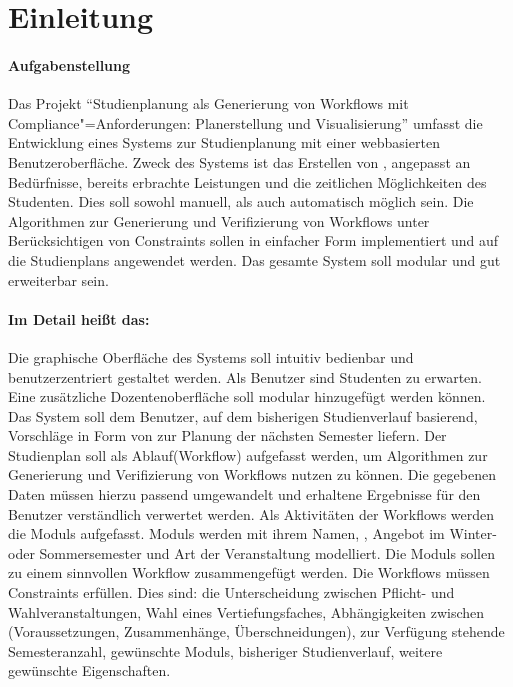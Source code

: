 \section{Einleitung}
\paragraph{Aufgabenstellung}
Das Projekt \enquote{Studienplanung als Generierung von Workflows mit Compliance"=Anforderungen: Planerstellung und Visualisierung} umfasst die Entwicklung eines Systems zur Studienplanung mit einer webbasierten Benutzeroberfläche. Zweck des Systems ist das Erstellen von , angepasst an Bedürfnisse, bereits erbrachte Leistungen und die zeitlichen Möglichkeiten des Studenten. Dies soll sowohl manuell, als auch automatisch möglich sein. Die Algorithmen zur \gls{Generierung} und \gls{Verifizierung} von Workflows unter Berücksichtigen von \glspl{Constraint} sollen in einfacher Form implementiert und auf die \glspl{Studienplan} angewendet werden. Das gesamte System soll \gls{modular} und gut erweiterbar sein.\\
\paragraph{Im Detail heißt das:}
Die graphische Oberfläche des Systems soll intuitiv bedienbar und benutzerzentriert gestaltet werden. Als \gls{Benutzer} sind Studenten zu erwarten. Eine zusätzliche Dozentenoberfläche soll \gls{modular} hinzugefügt werden können. Das System soll dem \gls{Benutzer}, auf dem bisherigen Studienverlauf basierend, Vorschläge in Form von  zur Planung der nächsten Semester liefern. Der \gls{Studienplan} soll als Ablauf(Workflow) aufgefasst werden, um Algorithmen zur \gls{Generierung} und \gls{Verifizierung} von Workflows nutzen zu können. Die gegebenen Daten müssen hierzu passend umgewandelt und erhaltene Ergebnisse für den \gls{Benutzer} verständlich verwertet werden. Als Aktivitäten der Workflows werden die \glspl{Modul} aufgefasst. \glspl{Modul} werden mit ihrem Namen, , Angebot im Winter- oder Sommersemester und Art der Veranstaltung modelliert. Die \glspl{Modul} sollen zu einem sinnvollen Workflow zusammengefügt werden. Die Workflows müssen \glspl{Constraint} erfüllen. Dies sind: die Unterscheidung zwischen Pflicht- und Wahlveranstaltungen, Wahl eines Vertiefungsfaches, Abhängigkeiten zwischen  (Voraussetzungen, Zusammenhänge, Überschneidungen), zur Verfügung stehende Semesteranzahl, gewünschte \glspl{Modul}, bisheriger Studienverlauf, weitere gewünschte Eigenschaften.\\